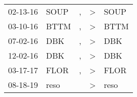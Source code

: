 \begin{supertabular}{p{0.07\textwidth}p{0.06\textwidth}p{0.02\textwidth}p{0.02\textwidth}p{0.06\textwidth}}
 02-13-16\textsuperscript{} &  SOUP\textsuperscript{} &             , &  \textgreater &  SOUP\textsuperscript{} \\
 03-10-16\textsuperscript{} &  BTTM\textsuperscript{} &             , &  \textgreater &  BTTM\textsuperscript{} \\
 07-02-16\textsuperscript{} &   DBK\textsuperscript{} &             , &  \textgreater &   DBK\textsuperscript{} \\
 12-02-16\textsuperscript{} &   DBK\textsuperscript{} &             , &  \textgreater &   DBK\textsuperscript{} \\
 03-17-17\textsuperscript{} &  FLOR\textsuperscript{} &             , &  \textgreater &  FLOR\textsuperscript{} \\
 08-18-19\textsuperscript{} &  reso\textsuperscript{} &               &  \textgreater &  reso\textsuperscript{} \\
\end{supertabular}
